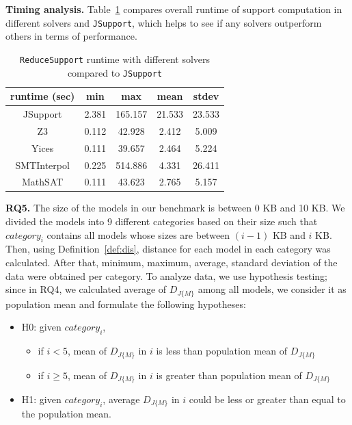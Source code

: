 
\textbf{Timing analysis.} Table~\ref{tab:eff-comp-jsup} compares overall runtime of support computation in different solvers and \texttt{JSupport}, which helps to see if any solvers outperform others in terms of performance.
\begin{table}
  \centering
  \begin{tabular}{ |c||c|c|c|c| }
    \hline
     runtime (sec) & min & max & mean & stdev \\[0.5ex]
    \hline\hline
    JSupport & 2.381 & 165.157 & 21.533 & 23.533 \\[0.5ex]
    Z3   & 0.112 & 42.928 & 2.412 & 5.009 \\[0.5ex]
    Yices &   0.111  & 39.657   & 2.464 & 5.224 \\[0.5ex]
    SMTInterpol& 0.225 & 514.886 &  4.331 & 26.411 \\[0.5ex]
    MathSAT & 0.111 & 43.623 &  2.765 & 5.157 \\[0.5ex]
    \hline
  \end{tabular}
  \caption{\small{\texttt{ReduceSupport} runtime with different solvers compared to \texttt{JSupport}}}
  \label{tab:eff-comp-jsup}
\end{table}

\textbf{RQ5.} The size of the models in our benchmark is between 0 KB and 10 KB.
We divided the models into 9 different categories based on their size such that $category_i$ contains
all models whose sizes are between $(i - 1)$ KB and $i$ KB. Then, using Definition~\ref{def:dis}, distance for each model in each category was calculated. After that, minimum, maximum, average, standard deviation of the data were obtained per category. To analyze data, we use hypothesis testing; since in RQ4, we calculated average of $D_{J\{M\}}$ among all models, we consider it as population mean and formulate the following hypotheses:
\begin{itemize}
  \item H0: given $category_i$,
  \begin{itemize}
    \item if $i < 5$, mean of $D_{J\{M\}}$ in $i$ is less than population mean of $D_{J\{M\}}$
    \item if $i \geq 5$, mean of $D_{J\{M\}}$ in $i$ is greater than population mean of $D_{J\{M\}}$
  \end{itemize}
  \item H1: given $category_i$, average $D_{J\{M\}}$ in $i$ could be less or
  greater than equal to the population mean.
\end{itemize}

